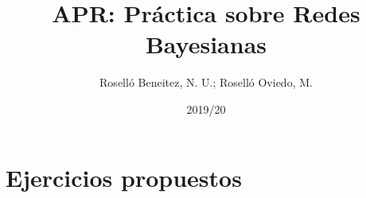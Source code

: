 \documentclass[a4paper]{article}
\begin{document}
\author{Roselló Beneitez, N. U.; Roselló Oviedo, M.}
\title{APR: Práctica sobre Redes Bayesianas}
\date{2019/20}
\maketitle{}
\thispagestyle{empty}

\newpage
\section{Ejercicios propuestos}
\end{document}
